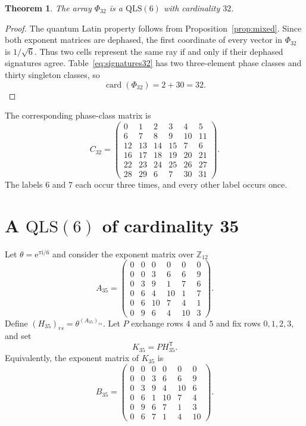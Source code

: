 \documentclass[11pt,a4paper]{article}
\newcommand{\Z}{\mathbb{Z}}
\newcommand{\QLS}{\mathrm{QLS}}
\newcommand{\card}{\operatorname{card}}
\newcommand{\ii}{\mathrm{i}}
\newcommand{\e}{\mathrm{e}}
\newtheorem{theorem}{Theorem}
\begin{document}
\begin{theorem}\label{thm:c32}
The array $\Phi_{32}$ is a $\QLS(6)$ with cardinality $32$.
\end{theorem}

\begin{proof}
The quantum Latin property follows from Proposition~\ref{prop:mixed}.  Since
both exponent matrices are dephased, the first coordinate of every vector in
$\Phi_{32}$ is $1/\sqrt6$.  Thus two cells represent the same ray if and only
if their dephased signatures agree.  Table~\eqref{eq:signatures32} has two
three-element phase classes and thirty singleton classes, so
\[
 \card(\Phi_{32})=2+30=32.
\]
\end{proof}

The corresponding phase-class matrix is
\begin{equation}\label{eq:class32}
C_{32}=
\begin{pmatrix}
0&1&2&3&4&5\\
6&7&8&9&10&11\\
12&13&14&15&7&6\\
16&17&18&19&20&21\\
22&23&24&25&26&27\\
28&29&6&7&30&31
\end{pmatrix}.
\end{equation}
The labels $6$ and $7$ each occur three times, and every other label occurs
once.

\section{A \texorpdfstring{$\QLS(6)$}{QLS(6)} of cardinality 35}\label{sec:c35}

Let $\theta=\e^{\pi\ii/6}$ and consider the exponent matrix over $\Z_{12}$
\begin{equation}\label{eq:A35}
 A_{35}=
 \begin{pmatrix}
 0&0&0&0&0&0\\
 0&0&3&6&6&9\\
 0&3&9&1&7&6\\
 0&6&4&10&1&7\\
 0&6&10&7&4&1\\
 0&9&6&4&10&3
 \end{pmatrix}.
\end{equation}
Define $(H_{35})_{rs}=\theta^{(A_{35})_{rs}}$.  Let $P$ exchange rows $4$
and $5$ and fix rows $0,1,2,3$, and set
\begin{equation}\label{eq:K35}
 K_{35}=P H_{35}^{\mathsf T}.
\end{equation}
Equivalently, the exponent matrix of $K_{35}$ is
\begin{equation}\label{eq:B35}
 B_{35}=
 \begin{pmatrix}
 0&0&0&0&0&0\\
 0&0&3&6&6&9\\
 0&3&9&4&10&6\\
 0&6&1&10&7&4\\
 0&9&6&7&1&3\\
 0&6&7&1&4&10
 \end{pmatrix}.
\end{equation}
\end{document}
